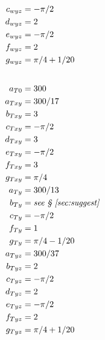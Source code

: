 \documentclass[10pt,reqno]{amsart}
\begin{document}
\begin{table}[p]
\begin{multicols}{3}
\begin{small}
\begin{align*}
c_{wyz} &= - \pi / 2 \\
d_{wyz} &= 2 \\
e_{wyz} &= - \pi / 2 \\
f_{wyz} &= 2 \\
g_{wyz} &= \pi / 4 + 1 / 20 \\
\intertext{}
a_{T0} &= 300 \\
a_{Txy} &= 300 / 17 \\
b_{Txy} &= 3 \\
c_{Txy} &= - \pi / 2 \\
d_{Txy} &= 3 \\
e_{Txy} &= - \pi / 2 \\
f_{Txy} &= 3 \\
g_{Txy} &= \pi / 4 \\
a_{Ty} &= 300 / 13 \\
b_{Ty} &= \text{\emph{see \textsection{}~\ref{sec:suggest}}} \\
c_{Ty} &= - \pi / 2 \\
f_{Ty} &= 1 \\
g_{Ty} &= \pi / 4 - 1 / 20 \\
a_{Tyz} &= 300 / 37 \\
b_{Tyz} &= 2 \\
c_{Tyz} &= - \pi / 2 \\
d_{Tyz} &= 2 \\
e_{Tyz} &= - \pi / 2 \\
f_{Tyz} &= 2 \\
g_{Tyz} &= \pi / 4 + 1 / 20 \\
\end{align*}
\end{small}
\end{multicols}
\caption{Coefficient recommendations from section~\ref{sec:suggest}.
         Standard MKS units are implied with each value; e.g.
         $R$ is given in
         \si{\joule\per\kilo\gram\per\kelvin} and $\mu_r$ is given in
         \si{\pascal\second}.
         Unlisted coefficients should be set to zero.
         \label{tbl:auxcoeff}}
\end{table}
\end{document}

